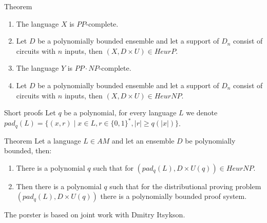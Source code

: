 \begin{frame}{}
\begin{columns}[t]
\begin{column}{0.32\linewidth}
        \begin{alertblock}{Theorem}
        	\begin{enumerate}
				\item The language $X$ is $PP$-complete.
		    	\item Let $D$ be a polynomially bounded ensemble and let a
				    support of $D_n$ consist of circuits with $n$ inputs, then 
		            $(X, D \times U) \in HeurP$.
                \item The language $Y$ is $PP \cdot NP$-complete.
		    	\item Let $D$ be a polynomially bounded ensemble and let a
				    support of $D_n$ consist of circuits with $n$ inputs, then
		            $(X, D \times U) \in HeurNP$.
		    \end{enumerate}
        \end{alertblock}

        \begin{block}{Short proofs}
            Let $q$ be a polynomial, for every language $L$ we denote $pad_q(L) = 
			\{(x, r) \mid x \in L, r \in \{0, 1\}^* , |r| \ge q(|x|)\}$.
        \end{block}

        \begin{alertblock}{Theorem}
            Let a language $L \in AM$ and let an ensemble $D$ be polynomially 
		    bounded, then:
		    \begin{enumerate}
    			\item There is a polynomial $q$ such that for $(pad_q(L),
				    D \times U(q)) \in HeurNP$.
        		\item Then there is a polynomial $q$ such that for the distributional
		            proving problem $(pad_q(L), D \times U(q))$ 
        		    there is a polynomially bounded proof system.
		    \end{enumerate}
        \end{alertblock}

        \begin{block}{}
            The porster is based on joint work with Dmitry Itsykson.
        \end{block}
        
        \begin{block}{}
            
        	    
        \end{block}
    \end{column}%

\end{columns}

\end{frame}

